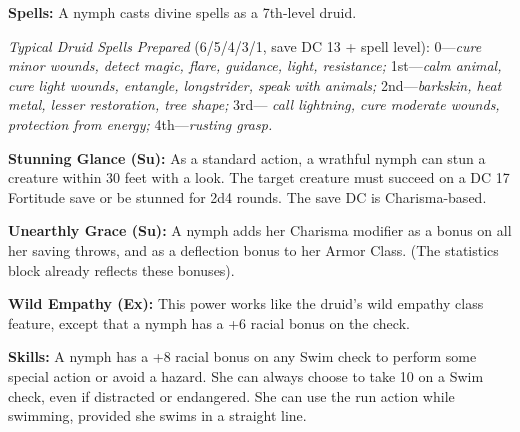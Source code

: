 \documentclass{article}
\begin{document}
\textbf{Spells:} A nymph casts divine spells as a 7th-level druid.

\textit{Typical Druid Spells Prepared }(6/5/4/3/1, save DC 13 + spell level): 0---\textit{cure 
minor wounds, detect magic, flare, guidance, light, resistance; }1st---\textit{calm 
animal, cure light wounds, entangle, longstrider, speak with animals; }2nd---\textit{barkskin, 
heat metal, lesser restoration, tree shape; }3rd--- \textit{call lightning, cure 
moderate wounds, protection from energy; }4th---\textit{rusting grasp.}

\textbf{Stunning Glance (Su): }As a standard action, a wrathful nymph can stun 
a creature within 30 feet with a look. The target creature must succeed on a DC 
17 Fortitude save or be stunned for 2d4 rounds. The save DC is Charisma-based.

\textbf{Unearthly Grace (Su):} A nymph adds her Charisma modifier as a bonus on 
all her saving throws, and as a deflection bonus to her Armor Class. (The statistics 
block already reflects these bonuses).

\textbf{Wild Empathy (Ex):} This power works like the druid's wild empathy class 
feature, except that a nymph has a +6 racial bonus on the check.

\textbf{Skills:} A nymph has a +8 racial bonus on any Swim check to perform some 
special action or avoid a hazard. She can always choose to take 10 on a Swim check, 
even if distracted or endangered. She can use the run action while swimming, provided 
she swims in a straight line.

\newpage
\end{document}
